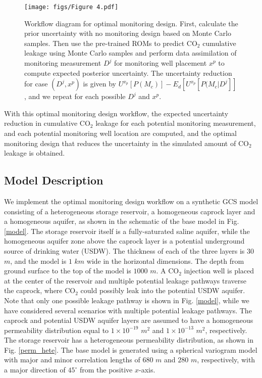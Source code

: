 \documentclass[a4paper,fleqn]{cas-sc}
\begin{document}
\begin{figure}
    \centering
    \texttt{[image: figs/Figure 4.pdf]}
    \caption{Workflow diagram for optimal monitoring design. First, calculate the prior uncertainty with no monitoring design based on Monte Carlo samples. Then use the pre-trained ROMs to predict CO$_2$ cumulative leakage using Monte Carlo samples and perform data assimilation of monitoring measurement $D^j$ for monitoring well placement $x^p$ to compute expected posterior uncertainty. The uncertainty reduction for case $(D^j,x^p)$ is given by $U^{x_p}[P(M_c)] - E_d[U^{x_p}[P(M_c \vert D^j]]$, and we repeat for each possible $D^j$ and $x^p$.}
    \label{opt_workflow}
\end{figure}

With this optimal monitoring design workflow, the expected uncertainty reduction in cumulative CO$_2$ leakage for each potential monitoring measurement, and each potential monitoring well location are computed, and the optimal monitoring design that reduces the uncertainty in the simulated amount of CO$_2$ leakage is obtained.

\subsection{Model Description}
We implement the optimal monitoring design workflow on a synthetic GCS model consisting of a heterogeneous storage reservoir, a homogeneous caprock layer and a homogeneous aquifer, as shown in the schematic of the base model in Fig. \ref{model}. The storage reservoir itself is a fully-saturated saline aquifer, while the homogeneous aquifer zone above the caprock layer is a potential underground source of drinking water (USDW). The thickness of each of the three layers is $30$ $m$, and the model is $1$ $km$ wide in the horizontal dimensions. The depth from ground surface to the top of the model is $1000$ $m$. A CO$_2$ injection well is placed at the center of the reservoir and multiple potential leakage pathways traverse the caprock, where CO$_2$ could possibly leak into the potential USDW aquifer. Note that only one possible leakage pathway is shown in Fig. \ref{model}, while we have considered several scenarios with multiple potential leakage pathways. The caprock and potential USDW aquifer layers are assumed to have a homogeneous permeability distribution equal to $1\times10^{-19}$ $m^2$ and $1\times10^{-13}$ $m^2$, respectively. The storage reservoir has a heterogeneous permeability distribution, as shown in Fig. \ref{perm_hete}. The base model is generated using a spherical variogram model \citep{Caers2005, Chen2017623} with major and minor correlation lengths of $680$ $m$ and $280$ $m$, respectively, with a major direction of $45^\circ$ from the positive $x$-axis.
\end{document}
